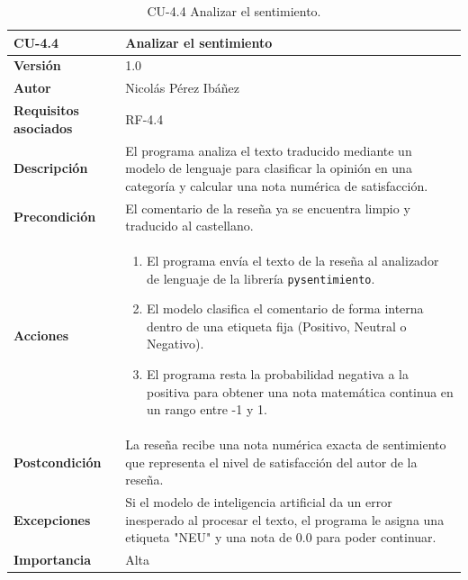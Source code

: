 \begin{table}[p]
	\centering
	\begin{tabularx}{\linewidth}{ p{} p{} }
		\toprule
		\textbf{CU-4.4}  & \textbf{Analizar el sentimiento}\\
		\toprule
		\textbf{Versión}              & 1.0    \\
		\textbf{Autor}                & Nicolás Pérez Ibáñez \\
		\textbf{Requisitos asociados} & RF-4.4 \\
		\textbf{Descripción}          & El programa analiza el texto traducido mediante un modelo de lenguaje para clasificar la opinión en una categoría y calcular una nota numérica de satisfacción. \\
		\textbf{Precondición}         & El comentario de la reseña ya se encuentra limpio y traducido al castellano. \\
		\textbf{Acciones}             &
		\begin{enumerate}
			\def\labelenumi{\arabic{enumi}.}
			\tightlist
			\item El programa envía el texto de la reseña al analizador de lenguaje de la librería \texttt{pysentimiento}.
			\item El modelo clasifica el comentario de forma interna dentro de una etiqueta fija (Positivo, Neutral o Negativo).
			\item El programa resta la probabilidad negativa a la positiva para obtener una nota matemática continua en un rango entre -1 y 1.
		\end{enumerate}\\
		\textbf{Postcondición}        & La reseña recibe una nota numérica exacta de sentimiento que representa el nivel de satisfacción del autor de la reseña. \\
		\textbf{Excepciones}          & Si el modelo de inteligencia artificial da un error inesperado al procesar el texto, el programa le asigna una etiqueta "NEU" y una nota de 0.0 para poder continuar. \\
		\textbf{Importancia}          & Alta \\
		\bottomrule
	\end{tabularx}
	\caption{CU-4.4 Analizar el sentimiento.}
\end{table}


